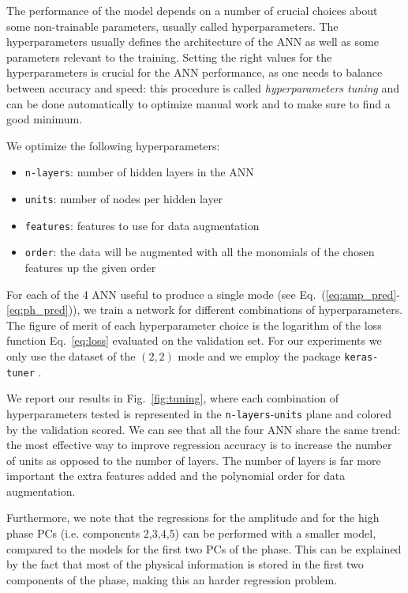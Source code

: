 \documentclass[twocolumn,showpacs,preprintnumbers,nofootinbib,prd,
superscriptaddress,10pt]{revtex4-1}
\begin{document}
The performance of the model depends on a number of crucial choices about some non-trainable parameters, usually called hyperparameters. The hyperparameters usually defines the architecture of the ANN as well as some parameters relevant to the training.
Setting the right values for the hyperparameters is crucial for the ANN performance, as one needs to balance between accuracy and speed: this procedure is called {\it hyperparameters tuning} and can be done automatically to optimize manual work and to make sure to find a good minimum.

We optimize the following hyperparameters:
\begin{itemize}
	\item \texttt{n-layers}: number of hidden layers in the ANN
	\item \texttt{units}: number of nodes per hidden layer
	\item \texttt{features}: features to use for data augmentation
	\item \texttt{order}: the data will be augmented with all the monomials of the chosen features up the given order
\end{itemize}

For each of the 4 ANN useful to produce a single mode (see Eq.~(\ref{eq:amp_pred}-\ref{eq:ph_pred})), we train a network for different combinations of hyperparameters. The figure of merit of each hyperparameter choice is the logarithm of the loss function Eq.~\eqref{eq:loss} evaluated on the validation set.
For our experiments we only use the dataset of the $(2,2)$ mode and we employ the package \texttt{keras-tuner} \cite{omalley2019kerastuner}.

We report our results in Fig.~\ref{fig:tuning}, where each combination of hyperparameters tested is represented in the \texttt{n-layers}-\texttt{units} plane and colored by the validation scored. 
We can see that all the four ANN share the same trend: the most effective way to improve regression accuracy is to increase the number of units as opposed to the number of layers.
The number of layers is far more important the extra features added and the polynomial order for data augmentation.

Furthermore, we note that the regressions for the amplitude and for the high phase PCs (i.e. components 2,3,4,5) can be performed with a smaller model, compared to the models for the first two PCs of the phase. This can be explained by the fact that most of the physical information is stored in the first two components of the phase, making this an harder regression problem.
\end{document}
